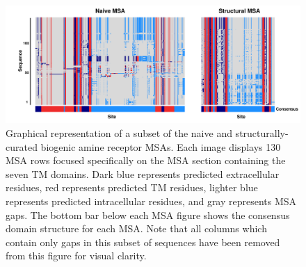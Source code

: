 \documentclass[fleqn,10pt]{wlpeerj}
\begin{document}
\vspace*{4cm}


\begin{figure}[htbp]
	\centerline{\includegraphics[width=7in]{figures/domains_naive_struc.pdf}}
	\caption{\label{domains} Graphical representation of a subset of the naive and structurally-curated biogenic amine receptor MSAs. Each image displays 130 MSA rows focused specifically on the MSA section containing the seven TM domains. Dark blue represents predicted extracellular residues, red represents predicted TM residues, lighter blue represents predicted intracellular residues, and gray represents MSA gaps. The bottom bar below each MSA figure shows the consensus domain structure for each MSA. Note that all columns which contain only gaps in this subset of sequences have been removed from this figure for visual clarity.}
\end{figure}

\newpage
\end{document}
